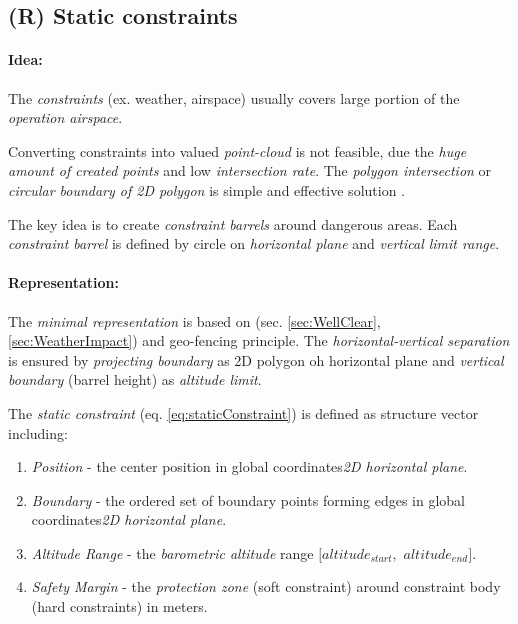 \subsection{(R) Static constraints}\label{s:virtualConstraints}
\paragraph{Idea:} The \emph{constraints} (ex. weather, airspace) usually covers large portion of the \emph{operation airspace}. 

Converting constraints into valued \emph{point-cloud} is not feasible, due the \emph{huge amount of created points} and low \emph{intersection rate}. The \emph{polygon intersection} or \emph{circular boundary of 2D polygon} is simple and effective solution \cite{ritter1990efficient,welzl1991smallest}. 

The key idea is to create \emph{constraint barrels} around dangerous areas. Each \emph{constraint barrel} is defined by circle on \emph{horizontal plane} and \emph{vertical limit range}.

\paragraph{Representation:} The \emph{minimal representation} is based on (sec. \ref{sec:WellClear}, \ref{sec:WeatherImpact}) and geo-fencing principle. The \emph{horizontal-vertical separation} is ensured by \emph{projecting boundary} as 2D polygon oh horizontal plane and \emph{vertical boundary} (barrel height) as \emph{altitude limit}. 

The \emph{static constraint} (eq. \ref{eq:staticConstraint}) is defined as structure vector including:
\begin{enumerate}
    \item \emph{Position} - the center position in global coordinates\emph{2D horizontal plane}.
    
    \item \emph{Boundary} - the ordered set of boundary points forming edges in global coordinates\emph{2D horizontal plane}.
    
    \item \emph{Altitude Range} - the \emph{barometric altitude} range $[altitude_{start},$ $altitude_{end}]$.
    
    \item \emph{Safety Margin} - the \emph{protection zone} (soft constraint) around constraint body (hard constraints) in meters.
\end{enumerate}

